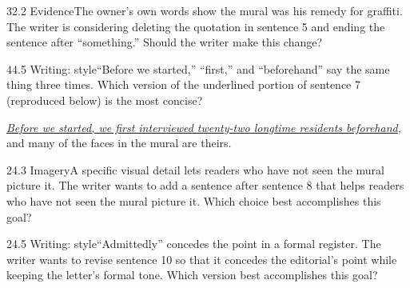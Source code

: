 \documentclass[11pt]{article}
\begin{document}
\begin{q}{3}{2.2 Evidence}{The owner's own words show the mural was his remedy for graffiti.}
The writer is considering deleting the quotation in sentence 5 and ending the sentence after ``something.'' Should the writer make this change?
\end{q}

\begin{q}{4}{4.5 Writing: style}{``Before we started,'' ``first,'' and ``beforehand'' say the same thing three times.}
Which version of the underlined portion of sentence 7 (reproduced below) is the most concise?

\emph{\underline{Before we started, we first interviewed twenty-two longtime residents beforehand},} and many of the faces in the mural are theirs.
\end{q}

\begin{q}{2}{4.3 Imagery}{A specific visual detail lets readers who have not seen the mural picture it.}
The writer wants to add a sentence after sentence 8 that helps readers who have not seen the mural picture it. Which choice best accomplishes this goal?
\end{q}

\begin{q}{2}{4.5 Writing: style}{``Admittedly'' concedes the point in a formal register.}
The writer wants to revise sentence 10 so that it concedes the editorial's point while keeping the letter's formal tone. Which version best accomplishes this goal?
\end{q}
\end{document}
